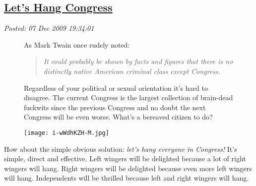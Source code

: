 %

\subsection*{\href{http://bakerjd99.wordpress.com/2009/12/07/lets-hang-congress/}{Let's Hang Congress}}


\noindent\emph{Posted: 07 Dec 2009 19:34:01}
\vspace{6pt}


\begin{figure}[ht]
\begin{minipage}[b]{0.50\textwidth}
As
Mark Twain once rudely noted:

\medskip

\begin{quotation}
\emph{It could probably be shown by facts and figures that there is no
distinctly native American criminal class except Congress.}
\end{quotation}

\medskip


Regardless of your political or sexual orientation it's hard to
disagree. The current Congress is the largest collection of brain-dead
fuckwits since the previous Congress and no doubt the next Congress will
be even worse. What's a bereaved citizen to do?
\end{minipage}
\hspace{1pt}
\begin{minipage}[b]{0.45\textwidth}
\centering
\texttt{[image: i-wWdhKZH-M.jpg]}
\label{fig:302X0}
\end{minipage}
\end{figure}

How about the simple obvious solution: \emph{let's hang everyone in
Congress!} It's simple, direct and effective. Left wingers will be
delighted because a lot of right wingers will hang. Right wingers will
be delighted because even more left wingers will hang. Independents will
be thrilled because left and right wingers will hang.

